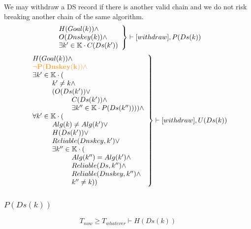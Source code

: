 \documentclass[twoside,english, a4paper]{article}
\newcommand{\highlightMinSig}[1]{\textcolor{MinSig}{\bf{#1}}}
\newcommand{\mathbox}[1]{#1}
\begin{document}
\mathbox{

	We may withdraw a DS record if there is another valid chain and
	we do not risk breaking another chain of the same algorithm.
\highlightMinSig{
	\begin{equation}
		\left.
		\begin{array}{l}
\hskip 0cm				H(Goal(k)) \wedge \\
\hskip 0cm				O(Dnskey(k)) \wedge \\
\hskip 0cm				\exists k' \in \mathbb{K} \cdot C(Ds(k'))\\
		\end{array}
		\right\} \vdash [withdraw], P(Ds(k)) \\
	\end{equation}
	}
	\begin{equation}
		\left.
		\begin{array}{l}
\hskip 0cm			H(Goal(k)) \wedge \\
\highlightMinSig{\hskip 0cm		\neg P(Dnskey(k)) \wedge }\\
\hskip 0cm			\exists k' \in \mathbb{K} \cdot (\\
\hskip 1cm				k' \neq k \wedge \\
\hskip 1cm				(O(Ds(k'))\vee \\
\hskip 2cm					C(Ds(k')) \wedge \\
\hskip 2cm					\exists k'' \in \mathbb{K}\cdot P(Ds(k'')))) \wedge \\
\hskip 0cm				\forall k' \in \mathbb{K} \cdot ( \\
\hskip 1cm					Alg(k) \neq Alg(k') \vee \\
\hskip 1cm					H(Ds(k')) \vee \\
\hskip 1cm					Reliable(Dnskey, k') \vee \\
\hskip 1cm					\exists k'' \in \mathbb{K} \cdot (\\
\hskip 2cm 						Alg(k'')=Alg(k') \wedge \\
\hskip 2cm 						Reliable(Ds, k'') \wedge \\
\hskip 2cm 						Reliable(Dnskey, k'') \wedge \\
\hskip 2cm 						k'' \neq k))
		\end{array}
		\right\} \vdash [withdraw], U(Ds(k)) \\
	\end{equation}
}

\subsubsection{$P(Ds(k))$}
\highlightMinSig{
\begin{equation}
		T_{now} \geq T_{whatever} \vdash H(Ds(k))
\end{equation}
}
\end{document}
